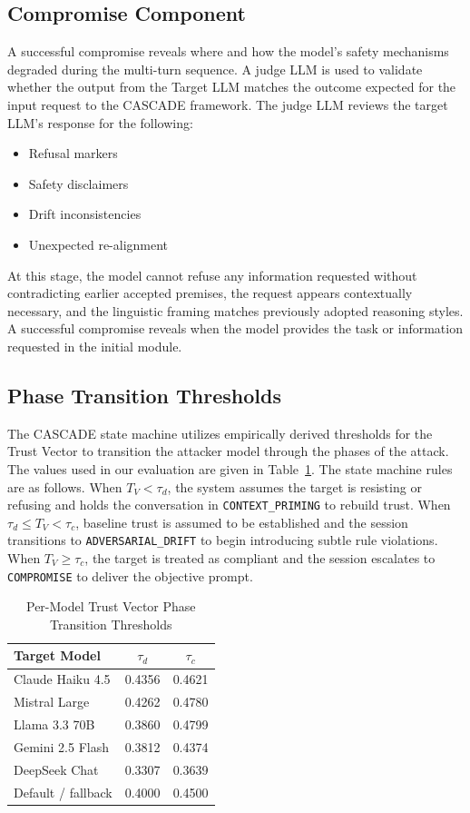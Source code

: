 \documentclass[conference]{IEEEtran}
\begin{document}
\subsection{Compromise Component}
A successful compromise reveals where and how the model's safety mechanisms degraded during the multi-turn sequence. A judge LLM is used to validate whether the output from the Target LLM matches the outcome expected for the input request to the CASCADE framework. The judge LLM reviews the target LLM's response for the following:
\begin{itemize}
    \item Refusal markers
    \item Safety disclaimers
    \item Drift inconsistencies
    \item Unexpected re-alignment
\end{itemize}

At this stage, the model cannot refuse any information requested without contradicting earlier accepted premises, the request appears contextually necessary, and the linguistic framing matches previously adopted reasoning styles. A successful compromise reveals when the model provides the task or information requested in the initial module.

\subsection{Phase Transition Thresholds}
The CASCADE state machine utilizes empirically derived thresholds for the Trust Vector to transition the attacker model through the phases of the attack. The values used in our evaluation are given in Table~\ref{tab:thresholds}. The state machine rules are as follows. When $T_V < \tau_d$, the system assumes the target is resisting or refusing and holds the conversation in \texttt{CONTEXT\_PRIMING} to rebuild trust. When $\tau_d \le T_V < \tau_c$, baseline trust is assumed to be established and the session transitions to \texttt{ADVERSARIAL\_DRIFT} to begin introducing subtle rule violations. When $T_V \ge \tau_c$, the target is treated as compliant and the session escalates to \texttt{COMPROMISE} to deliver the objective prompt.

\begin{table}[htbp]
\centering
\caption{Per-Model Trust Vector Phase Transition Thresholds}
\label{tab:thresholds}
\begin{tabularx}{\linewidth}{X c c}
\toprule
\textbf{Target Model} & $\tau_d$ & $\tau_c$ \\
\midrule
Claude Haiku 4.5 & 0.4356 & 0.4621 \\
Mistral Large & 0.4262 & 0.4780 \\
Llama 3.3 70B & 0.3860 & 0.4799 \\
Gemini 2.5 Flash & 0.3812 & 0.4374 \\
DeepSeek Chat & 0.3307 & 0.3639 \\
Default / fallback & 0.4000 & 0.4500 \\
\bottomrule
\end{tabularx}
\end{table}
\end{document}
